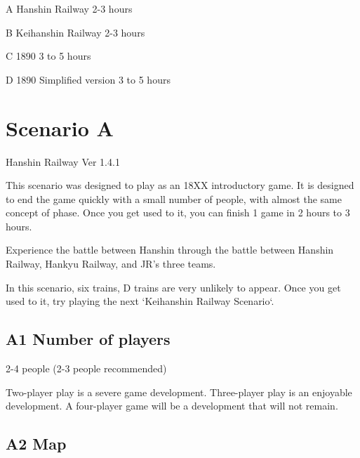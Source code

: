 \documentclass{article}
\begin{document}
\begin{CJK}{UTF8}{min}
A Hanshin Railway 2-3 hours

B Keihanshin Railway 2-3 hours

C 1890 3 to 5 hours

D 1890 Simplified version 3 to 5 hours








\section*{Scenario A}
Hanshin Railway Ver 1.4.1

This scenario was designed to play as an 18XX introductory game. It is
designed to end the game quickly with a small number of people, with
almost the same concept of phase. Once you get used to it, you can
finish 1 game in 2 hours to 3 hours.

Experience the battle between Hanshin through the battle between
Hanshin Railway, Hankyu Railway, and JR's three teams.

In this scenario, six trains, D trains are very unlikely to
appear. Once you get used to it, try playing the next `Keihanshin
Railway Scenario`.

\subsection*{A1 Number of players}

2-4 people (2-3 people recommended)

Two-player play is a severe game development. Three-player play is an
enjoyable development. A four-player game will be a development that
will not remain.

\subsection*{A2 Map}


\end{CJK}
\end{document}
